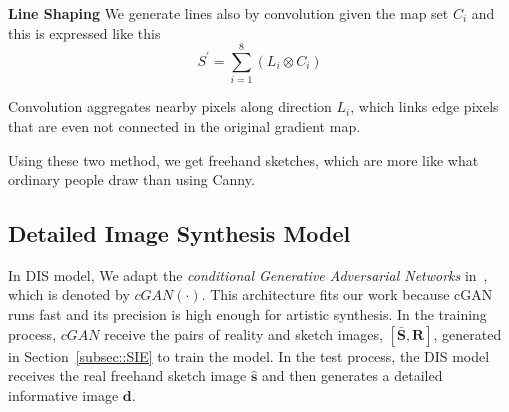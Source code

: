 \documentclass[10pt,twocolumn,letterpaper]{article}
\begin{document}
\textbf{Line Shaping} We generate lines also by convolution given the map set $C_{i}$ and this is expressed like this
	\begin{equation}
	S^{'} = \sum_{i=1}^{8}(L_{i} \otimes C_{i})
	\end{equation}

Convolution aggregates nearby pixels along direction $L_{i}$, which links edge pixels that are even not connected in the original gradient map.

Using these two method, we get freehand sketches, which are more like what ordinary people draw than using Canny.


%
%
%
%

\subsection{Detailed Image Synthesis Model}\label{subsec::DIS}
In DIS model, We adapt the \textit{conditional Generative Adversarial Networks} in~\cite{isola2016image}, which is denoted by $cGAN(\cdot)$. This architecture fits our work because cGAN runs fast and its precision is high enough for artistic synthesis. In the training process, $cGAN$ receive the pairs of reality and sketch images, $\bm{[\bar{S}, R]}$, generated in Section~\ref{subsec::SIE} to train the model. In the test process, the DIS model receives the real freehand sketch image $\bm{\hat{s}}$ and then generates a detailed informative image $\bm{d}$.
\end{document}
